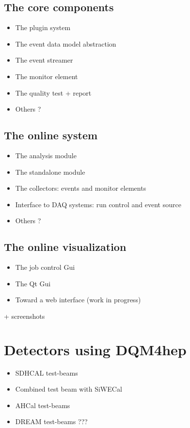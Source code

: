 \documentclass{webofc}
\begin{document}
\subsection{The core components}
\label{subsec:core}

\begin{itemize}
  \item The plugin system
  \item The event data model abstraction
  \item The event streamer
  \item The monitor element
  \item The quality test + report
  \item Others ?
\end{itemize}

\subsection{The online system}
\label{subsec:online}

\begin{itemize}
  \item The analysis module
  \item The standalone module
  \item The collectors: events and monitor elements
  \item Interface to DAQ systems: run control and event source
  \item Others ?
\end{itemize}

\subsection{The online visualization}
\label{subsec:vis}

\begin{itemize}
  \item The job control Gui
  \item The Qt Gui
  \item Toward a web interface (work in progress)
\end{itemize}

+ screenshots

\section{Detectors using DQM4hep}
\label{sec:detectors}

\begin{itemize}
  \item SDHCAL test-beams
  \item Combined test beam with SiWECal
  \item AHCal test-beams
  \item DREAM test-beams ???
\end{itemize}
\end{document}
